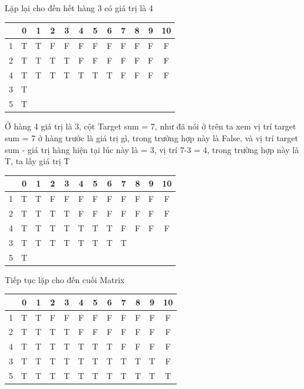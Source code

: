 \documentclass{article}
\begin{document}
    Lặp lại cho đến hết hàng 3 có giá trị là 4\\
    \begin{center}
        \begin{tabular}{|c|c|c|c|c|c|c|c|c|c|c|c|}
        \hline
        {}&{0}&{1}&{2}&{3}&{4}&{5}&{6}&{7}&{8}&{9}&{10}\\
        \hline
        1&T&T&F&F&F&F&F&F&F&F&F\\
        \hline
        2&T&T&T&T&F&F&F&F&F&F&F\\
        \hline
        4&T&T&T&T&T&T&T&F&F&F&F\\
        \hline
        3&T&&&&&&&&&&\\
        \hline
        5&T&&&&&&&&&&\\
        \hline
    \end{tabular}
    \end{center}
    Ở hàng 4 giá trị là 3, cột Target sum = 7, như đã nói ở trên ta xem vị trí target sum = 7 ở hàng trước là giá trị gì, trong trường hợp này là False, và vị trí target sum - giá trị hàng hiện tại lúc này là = 3, vị trí 7-3 = 4, trong trường hợp này là T, ta lấy giá trị T\\
    \begin{center}
        \begin{tabular}{|c|c|c|c|c|c|c|c|c|c|c|c|}
        \hline
        {}&{0}&{1}&{2}&{3}&{4}&{5}&{6}&{7}&{8}&{9}&{10}\\
        \hline
        1&T&T&F&F&F&F&F&F&F&F&F\\
        \hline
        2&T&T&T&T&F&F&F&F&F&F&F\\
        \hline
        4&T&T&T&T&T&T&T&F&F&F&F\\
        \hline
        3&T&T&T&T&T&T&T&T&&&\\
        \hline
        5&T&&&&&&&&&&\\
        \hline
    \end{tabular}
    \end{center}
    
    Tiếp tục lặp cho đến cuối Matrix\\
    \begin{center}
        \begin{tabular}{|c|c|c|c|c|c|c|c|c|c|c|c|}
        \hline
        {}&{0}&{1}&{2}&{3}&{4}&{5}&{6}&{7}&{8}&{9}&{10}\\
        \hline
        1&T&T&F&F&F&F&F&F&F&F&F\\
        \hline
        2&T&T&T&T&F&F&F&F&F&F&F\\
        \hline
        4&T&T&T&T&T&T&T&F&F&F&F\\
        \hline
        3&T&T&T&T&T&T&T&T&T&T&F\\
        \hline
        5&T&T&T&T&T&T&T&T&T&T&T\\
        \hline
    \end{tabular}
    \end{center}
    
\end{document}
